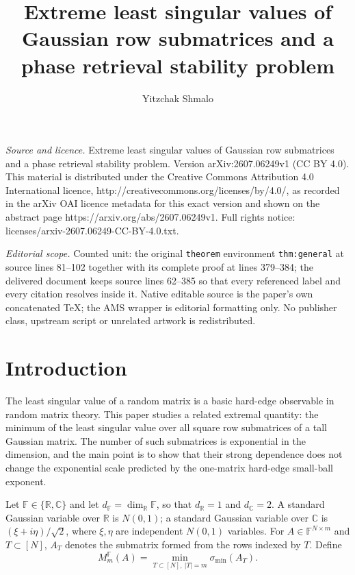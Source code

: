 \documentclass[10pt,a4paper]{amsart}
\newcommand{\R}{\mathbb{R}}
\newcommand{\C}{\mathbb{C}}
\newcommand{\F}{\mathbb{F}}
\begin{document}
\title[Extreme least singular values of Gaussian row submatrices an]{Extreme least singular values of Gaussian row submatrices and a phase retrieval stability problem}
\author{Yitzchak Shmalo}
\date{}
\maketitle
\noindent\emph{Source and licence.} Extreme least singular values of Gaussian row submatrices and a phase retrieval stability problem. Version arXiv:2607.06249v1 (CC BY 4.0). This material is distributed under the Creative Commons Attribution 4.0 International licence, http://creativecommons.org/licenses/by/4.0/, as recorded in the arXiv OAI licence metadata for this exact version and shown on the abstract page https://arxiv.org/abs/2607.06249v1. Full rights notice: licenses/arxiv-2607.06249-CC-BY-4.0.txt.\par\smallskip
\noindent\textit{Editorial scope.} Counted unit: the original \texttt{theorem} environment \texttt{thm:general} at source lines 81--102 together with its complete proof at lines 379--384; the delivered document keeps source lines 62--385 so that every referenced label and every citation resolves inside it. Native editable source is the paper's own concatenated TeX; the AMS wrapper is editorial formatting only. No publisher class, upstream script or unrelated artwork is redistributed.
\section{Introduction}

The least singular value of a random matrix is a basic hard-edge observable in random matrix theory.
This paper studies a related extremal quantity: the minimum of the least singular value over all
square row submatrices of a tall Gaussian matrix. The number of such submatrices is exponential in
the dimension, and the main point is to show that their strong dependence does not change the
exponential scale predicted by the one-matrix hard-edge small-ball exponent.

Let $\F\in\{\R,\C\}$ and let $d_\F=\dim_\R\F$, so that $d_\R=1$ and $d_\C=2$. A standard Gaussian
variable over $\R$ is $N(0,1)$; a standard Gaussian variable over $\C$ is $(\xi+i\eta)/\sqrt2$, where
$\xi,\eta$ are independent $N(0,1)$ variables. For $A\in\F^{N\times m}$ and $T\subset[N]$, $A_T$
denotes the submatrix formed from the rows indexed by $T$. Define
\begin{equation}\label{eq:def-M}
  M_m^\F(A)=\min_{T\subset[N],\ |T|=m}\sigma_{\min}(A_T).
\end{equation}
\end{document}
